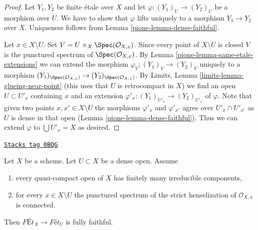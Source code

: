 \begin{proof}

Let $Y_1, Y_2$ be finite \'etale over $X$ and let
$\varphi : (Y_1)_U \to (Y_2)_U$ be a morphism over $U$. We have to show that
$\varphi$ lifts uniquely to a morphism $Y_1 \to Y_2$ over $X$.
Uniqueness follows from Lemma \ref{pione-lemma-dense-faithful}.

\medskip\noindent
Let $x \in X \setminus U$. Set $V = U \times_X \Spec(\mathcal{O}_{X, x})$.
Since every point of $X \setminus U$ is closed $V$ is the punctured spectrum
of $\Spec(\mathcal{O}_{X, x})$. By
Lemma \ref{pione-lemma-same-etale-extensions}
we can extend the morphism $\varphi_V : (Y_1)_V \to (Y_2)_V$
uniquely to a morphism
$(Y_1)_{\Spec(\mathcal{O}_{X, x})} \to (Y_2)_{\Spec(\mathcal{O}_{X, x})}$.
By Limits, Lemma \ref{limits-lemma-glueing-near-point}
(this uses that $U$ is retrocompact in $X$)
we find an open $U \subset U'_x$ containing $x$ and an extension
$\varphi'_x : (Y_1)_{U'_x} \to (Y_2)_{U'_x}$ of $\varphi$.
Note that given two points $x, x' \in X \setminus U$ the
morphisms $\varphi'_x$ and $\varphi'_{x'}$ agree over
$U'_x \cap U'_{x'}$ as $U$ is dense in that open
(Lemma \ref{pione-lemma-dense-faithful}). Thus we can extend $\varphi$
to $\bigcup U'_x = X$ as desired.
\end{proof}

\begin{lemma}
\label{pione-lemma-quasi-compact-dense-open-connected-at-infinity}
\href{https://stacks.math.columbia.edu/tag/0BQG}{\texttt{Stacks tag 0BQG}}

Let $X$ be a scheme. Let $U \subset X$ be a dense open. Assume
\begin{enumerate}
\item every quasi-compact open of $X$ has finitely many
irreducible components,
\item for every $x \in X \setminus U$ the punctured spectrum of the
strict henselization of $\mathcal{O}_{X, x}$ is connected.
\end{enumerate}
Then $\textit{F\'Et}_X \to \textit{F\'et}_U$ is fully faithful.
\end{lemma}

